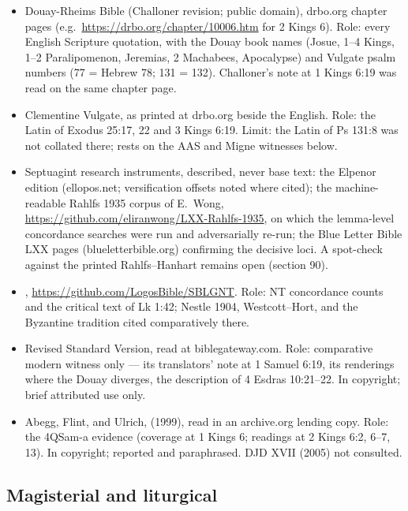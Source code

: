 \begin{itemize}
\item Douay-Rheims Bible (Challoner revision; public domain), drbo.org
chapter pages (e.g.\ \url{https://drbo.org/chapter/10006.htm} for
2 Kings 6). Role: every English Scripture quotation, with the Douay book
names (Josue, 1--4 Kings, 1--2 Paralipomenon, Jeremias, 2 Machabees,
Apocalypse) and Vulgate psalm numbers (77 = Hebrew 78; 131 = 132).
Challoner's note at 1 Kings 6:19 was read on the same chapter page.
\item Clementine Vulgate, as printed at drbo.org beside the English.
Role: the Latin of Exodus 25:17, 22 and 3 Kings 6:19. Limit: the Latin
of Ps 131:8 was not collated there; 
rests on the AAS and Migne witnesses below.
\item Septuagint research instruments, described, never base text: the
Elpenor edition (ellopos.net; versification offsets noted where cited);
the machine-readable Rahlfs 1935 corpus of E.~Wong,
\url{https://github.com/eliranwong/LXX-Rahlfs-1935}, on which the
lemma-level concordance searches were run and adversarially re-run; the
Blue Letter Bible LXX pages (blueletterbible.org) confirming the
decisive loci. A spot-check against the printed Rahlfs--Hanhart remains
open (section 90).
\item {},
\url{https://github.com/LogosBible/SBLGNT}. Role: NT concordance counts
and the critical text of Lk 1:42; Nestle 1904, Westcott--Hort, and the
Byzantine tradition cited comparatively there.
\item Revised Standard Version, read at biblegateway.com. Role:
comparative modern witness only --- its translators' note at 1 Samuel
6:19, its renderings where the Douay diverges, the description of
4 Esdras 10:21--22. In copyright; brief attributed use only.
\item Abegg, Flint, and Ulrich, 
(1999), read in an archive.org lending copy. Role: the 4QSam-a
evidence (coverage at 1 Kings 6; readings at 2 Kings 6:2, 6--7, 13). In
copyright; reported and paraphrased. DJD XVII (2005) not consulted.
\end{itemize}

\subsection*{Magisterial and liturgical}

